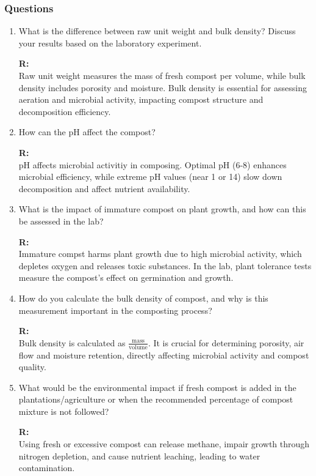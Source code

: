 \documentclass{article}
\begin{document}
\subsubsection{Questions}
\begin{enumerate}
    \item What is the difference between raw unit weight and bulk density? Discuss your
        results based on the laboratory experiment.

        \textbf{R:\\}
            Raw unit weight measures the mass of fresh compost per volume, while
            bulk density includes porosity and moisture. Bulk density is essential for
            assessing aeration and microbial activity, impacting compost structure and
            decomposition efficiency.

    \item How can the pH affect the compost?
    
        \textbf{R:\\}
            pH affects microbial activitiy in composing. Optimal pH (6-8) enhances microbial
            efficiency, while extreme pH values (near 1 or 14) slow down decomposition and
            affect nutrient availability.

    \item What is the impact of immature compost on plant growth, and how can this be
        assessed in the lab?

        \textbf{R:\\}
            Immature compst harms plant growth due to high microbial activity, which
            depletes oxygen and releases toxic substances. In the lab, plant tolerance tests
            measure the compost's effect on germination and growth.

    \item How do you calculate the bulk density of compost, and why is this measurement
        important in the composting process?

        \textbf{R:\\}
            Bulk density is calculated as $\frac{\text{mass}}{\text{volume}}$. It is crucial for
            determining porosity, air flow and moisture retention, directly affecting
            microbial activity and compost quality.

    \item What would be the environmental impact if fresh compost is added in the
        plantations/agriculture or when the recommended percentage of compost mixture
        is not followed?

        \textbf{R:\\}
            Using fresh or excessive compost can release methane, impair growth through
            nitrogen depletion, and cause nutrient leaching, leading to water contamination.

\end{enumerate}
\end{document}
